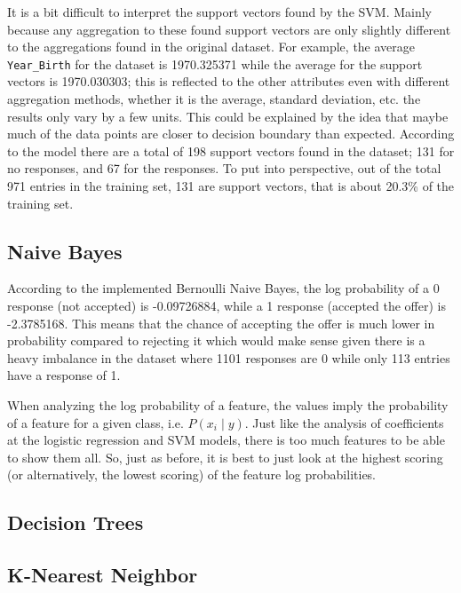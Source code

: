 It is a bit difficult to interpret the support vectors found by the SVM. Mainly because any aggregation to these found support vectors are only slightly different to the aggregations found in the original dataset. For example, the average \texttt{Year\_Birth} for the dataset is 1970.325371 while the average for the support vectors is 1970.030303; this is reflected to the other attributes even with different aggregation methods, whether it is the average, standard deviation, etc. the results only vary by a few units. This could be explained by the idea that maybe much of the data points are closer to decision boundary than expected. According to the model there are a total of 198 support vectors found in the dataset; 131 for no responses, and 67 for the responses. To put into perspective, out of the total 971 entries in the training set, 131 are support vectors, that is about 20.3\% of the training set. 

\subsection{Naive Bayes}

According to the implemented Bernoulli Naive Bayes, the log probability of a 0 response (not accepted) is -0.09726884, while a 1 response (accepted the offer) is -2.3785168. This means that the chance of accepting the offer is much lower in probability compared to rejecting it which would make sense given there is a heavy imbalance in the dataset where 1101 responses are 0 while only 113 entries have a response of 1. 

When analyzing the log probability of a feature, the values imply the probability of a feature for a given class, i.e. $P(x_i \mid y)$. Just like the analysis of coefficients at the logistic regression and SVM models, there is too much features to be able to show them all. So, just as before, it is best to just look at the highest scoring (or alternatively, the lowest scoring) of the feature log probabilities. 

\begin{table}[H]
\end{table}

\subsection{Decision Trees}

\subsection{K-Nearest Neighbor}
